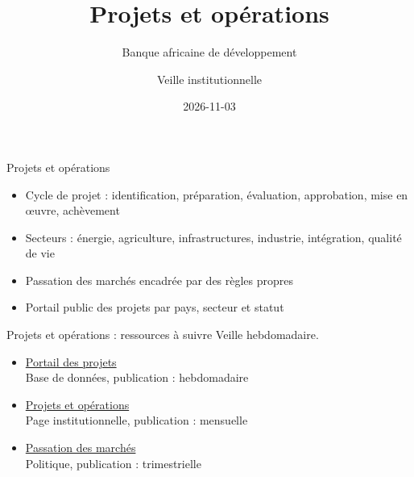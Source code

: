 \documentclass[aspectratio=169,11pt]{beamer}
\title{Projets et opérations}
\subtitle{Banque africaine de développement}
\author{Veille institutionnelle}
\date{2026-11-03}
\begin{document}
\begin{frame}\titlepage\end{frame}

\begin{frame}{Projets et opérations}
\begin{itemize}
\item Cycle de projet : identification, préparation, évaluation, approbation, mise en œuvre, achèvement
\item Secteurs : énergie, agriculture, infrastructures, industrie, intégration, qualité de vie
\item Passation des marchés encadrée par des règles propres
\item Portail public des projets par pays, secteur et statut
\end{itemize}
\end{frame}

\begin{frame}{Projets et opérations : ressources à suivre}
\small
Veille hebdomadaire.
\begin{itemize}
\item \href{https://projectsportal.afdb.org}{Portail des projets}\\{\footnotesize Base de données, publication : hebdomadaire}
\item \href{https://www.afdb.org/en/projects-and-operations}{Projets et opérations}\\{\footnotesize Page institutionnelle, publication : mensuelle}
\item \href{https://www.afdb.org/en/projects-and-operations/procurement}{Passation des marchés}\\{\footnotesize Politique, publication : trimestrielle}
\end{itemize}
\end{frame}
\end{document}
